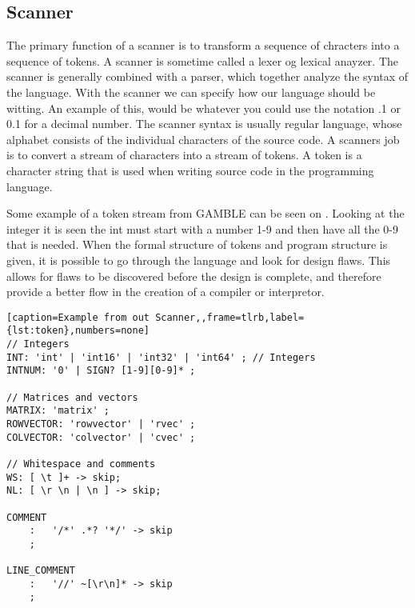\subsection{Scanner}
The primary function of a scanner is to transform a sequence of chracters into a sequence of tokens.
A scanner is sometime called a lexer og lexical anayzer.
The scanner is generally combined with a parser, which together analyze the syntax of the language.
With the scanner we can specify how our language should be witting. 
An example of this, would be whatever you could use the notation .1 or 0.1 for a decimal number.
The scanner syntax is usually regular language, whose alphabet consists of the individual characters of the source code.
A scanners job is to convert a stream of characters into a stream of tokens.
A token is a character string that is used when writing source code in the programming language.

Some example of a token stream from GAMBLE can be seen on .
Looking at the integer it is seen  the int must start with a number 1-9 and then have all the 0-9 that is needed.
When the formal structure of tokens and program structure is given, it is possible to go through the language and look for design flaws.
This allows for flaws to be discovered before the design is complete, and therefore provide a better flow in the creation of a compiler or interpretor. \citep{Crafting_book}

\begin{lstlisting}[caption=Example from out Scanner,,frame=tlrb,label={lst:token},numbers=none]
// Integers
INT: 'int' | 'int16' | 'int32' | 'int64' ; // Integers
INTNUM: '0' | SIGN? [1-9][0-9]* ;

// Matrices and vectors
MATRIX: 'matrix' ;
ROWVECTOR: 'rowvector' | 'rvec' ;
COLVECTOR: 'colvector' | 'cvec' ;  

// Whitespace and comments
WS: [ \t ]+ -> skip;
NL: [ \r \n | \n ] -> skip;

COMMENT
    :   '/*' .*? '*/' -> skip
    ;

LINE_COMMENT
    :   '//' ~[\r\n]* -> skip
    ;
\end{lstlisting}